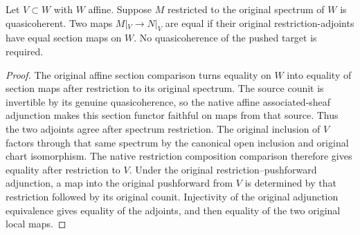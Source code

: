 \begin{lemma}
\label{lem:di-affine-adjoint-section-faithfulness}
\leanok
{}
Let $V\subset W$ with $W$ affine. Suppose $M$ restricted to the original
spectrum of $W$ is quasicoherent. Two maps $M|_V\to N|_V$ are equal if
their original restriction-adjoints have equal section maps on $W$.
No quasicoherence of the pushed target is required.
\end{lemma}
\begin{proof}
The original affine section comparison turns equality on $W$ into equality
of section maps after restriction to its original spectrum. The source
counit is invertible by its genuine quasicoherence, so the native affine
associated-sheaf adjunction makes this section functor faithful on maps
from that source. Thus the two adjoints agree after spectrum restriction.
The original inclusion of $V$ factors through that same spectrum by the
canonical open inclusion and original chart isomorphism. The native
restriction composition comparison therefore gives equality after
restriction to $V$. Under the original restriction--pushforward adjunction,
a map into the original pushforward from $V$ is determined by that
restriction followed by its original counit. Injectivity of the original
adjunction equivalence gives equality of the adjoints, and then equality
of the two original local maps.
\end{proof}

